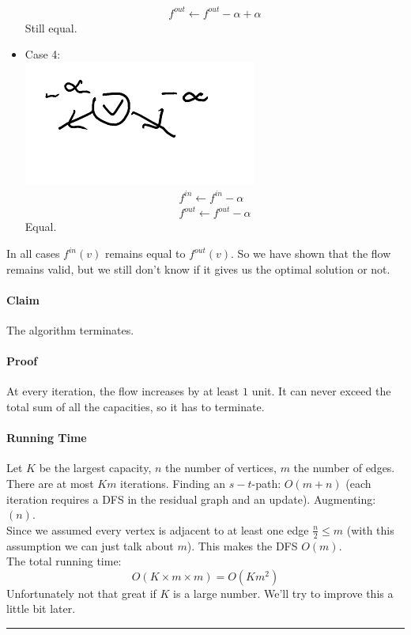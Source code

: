 \documentclass[12 pt]{article}
\begin{document}
\begin{itemize}
\begin{align*}
            \\ f^{out} \gets f^{out}-\alpha+\alpha
          \end{align*}
          Still equal.
        \item Case 4:
        \\\includegraphics[width=.3\textwidth]{i18.pdf}
          \begin{align*}
            f^{in} \gets f^{in} - \alpha
            \\ f^{out}\gets f^{out} - \alpha
          \end{align*}
          Equal.
        \end{itemize}
        In all cases $f^{in}(v)$ remains equal to $f^{out}(v)$. So we
        have shown that the flow remains valid, but we still don't
        know if it gives us the optimal solution or not.
        \paragraph{Claim} The algorithm terminates.
        \paragraph{Proof} At every iteration, the flow increases by at
        least $1$ unit. It can never exceed the total sum of all the
        capacities, so it has to terminate.
        \paragraph{Running Time} Let $K$ be the largest capacity, $n$
        the number of vertices, $m$ the number of edges. There are at
        most $Km$ iterations. Finding an $s-t$-path:
        $O(m+n)$ (each iteration requires a DFS in the residual graph
        and an update). Augmenting: $(n)$.
        \\ Since we assumed every vertex is adjacent to at least one
        edge $\frac{n}{2}\leq m$ (with this assumption we can just
        talk about $m$). This makes the DFS $O(m)$.
        \\ The total running time:
        $$O(K \times m \times m) = O(Km^2)$$
        Unfortunately not that great if $K$ is a large number. We'll
        try to improve this a little bit later.
        \rule{\textwidth}{0.5pt}
\end{document}
